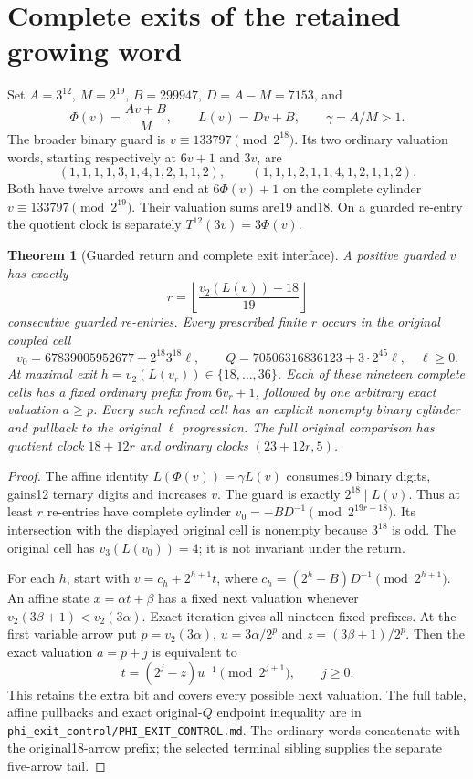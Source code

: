 \documentclass[11pt]{article}
\newtheorem{theorem}{Theorem}
\begin{document}
\section{Complete exits of the retained growing word}

Set $A=3^{12}$, $M=2^{19}$, $B=299947$, $D=A-M=7153$, and
\[
 \Phi(v)=\frac{Av+B}{M},\qquad L(v)=Dv+B,\qquad
 \gamma=A/M>1.
\]
The broader binary guard is $v\equiv133797\pmod{2^{18}}$.
Its two ordinary valuation words, starting respectively at $6v+1$ and $3v$,
are
\[
 (1,1,1,1,3,1,4,1,2,1,1,2),\qquad
 (1,1,1,2,1,1,4,1,2,1,1,2).
\]
Both have twelve arrows and end at $6\Phi(v)+1$ on the complete
cylinder $v\equiv133797\pmod{2^{19}}$. Their valuation sums are19 and18.
On a guarded re-entry the quotient clock is separately
$T^{12}(3v)=3\Phi(v)$.

\begin{theorem}[Guarded return and complete exit interface]
\label{thm:phiexitcontrol}
A positive guarded $v$ has exactly
\[
 r=\left\lfloor\frac{v_2(L(v))-18}{19}\right\rfloor
\]
consecutive guarded re-entries. Every prescribed finite $r$ occurs in the
original coupled cell
\[
 v_0=67839005952677+2^{18}3^{18}\ell,\qquad
 Q=70506316836123+3\cdot2^{45}\ell,\quad \ell\ge0.
\]
At maximal exit $h=v_2(L(v_r))\in\{18,\ldots,36\}$.
Each of these nineteen complete cells has a fixed ordinary prefix from
$6v_r+1$, followed by one arbitrary exact valuation $a\ge p$.
Every such refined cell has an explicit nonempty binary cylinder and
pullback to the original $\ell$ progression.
The full original comparison has quotient clock $18+12r$ and ordinary
clocks $(23+12r,5)$.
\end{theorem}
\begin{proof}
The affine identity $L(\Phi(v))=\gamma L(v)$ consumes19 binary digits,
gains12 ternary digits and increases $v$. The guard is exactly
$2^{18}\mid L(v)$. Thus at least $r$ re-entries have complete cylinder
$v_0=-BD^{-1}\pmod{2^{19r+18}}$. Its intersection with the displayed
original cell is nonempty because $3^{18}$ is odd. The original cell has
$v_3(L(v_0))=4$; it is not invariant under the return.

For each $h$, start with
$v=c_h+2^{h+1}t$, where
$c_h=(2^h-B)D^{-1}\pmod{2^{h+1}}$.
An affine state $x=\alpha t+\beta$ has a fixed next valuation whenever
$v_2(3\beta+1)<v_2(3\alpha)$. Exact iteration gives all nineteen fixed
prefixes. At the first variable arrow put
$p=v_2(3\alpha)$, $u=3\alpha/2^p$ and $z=(3\beta+1)/2^p$.
Then the exact valuation $a=p+j$ is equivalent to
\[
 t=(2^j-z)u^{-1}\pmod{2^{j+1}},\qquad j\ge0.
\]
This retains the extra bit and covers every possible next valuation.
The full table, affine pullbacks and exact original-$Q$ endpoint inequality
are in \texttt{phi\_exit\_control/PHI\_EXIT\_CONTROL.md}.
The ordinary words concatenate with the original18-arrow prefix;
the selected terminal sibling supplies the separate five-arrow tail.
\end{proof}
\end{document}

